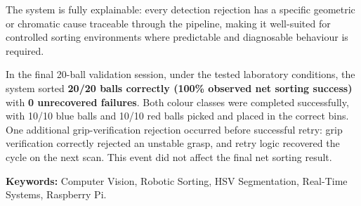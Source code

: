 \vspace{0.4cm}

The system is fully explainable: every detection rejection has a specific 
geometric or chromatic cause traceable through the pipeline, making it 
well-suited for controlled sorting environments where predictable and 
diagnosable behaviour is required.

\vspace{0.4cm}

In the final 20-ball validation session, under the tested
laboratory conditions, the system sorted \textbf{20/20 balls
correctly (100\% observed net sorting success)} with \textbf{0
unrecovered failures}. Both colour classes were completed
successfully, with 10/10 blue balls and 10/10 red balls picked
and placed in the correct bins. One additional grip-verification
rejection occurred before successful retry: grip verification
correctly rejected an unstable grasp, and retry logic recovered
the cycle on the next scan. This event did not affect the final
net sorting result.

\vspace{1cm}

\noindent\textbf{Keywords:} Computer Vision, Robotic Sorting, HSV Segmentation, 
Real-Time Systems, Raspberry Pi.

\clearpage
